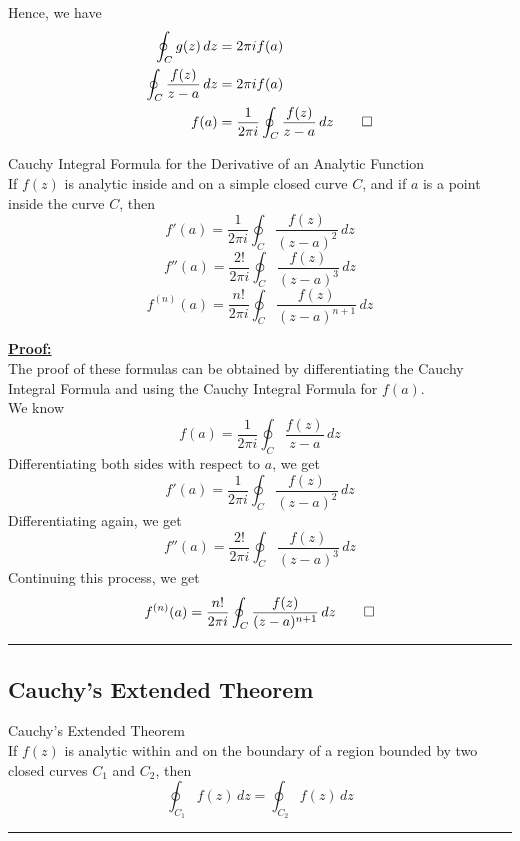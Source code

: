Hence, we have
\begin{align*}
    \oint_C g(z) \, dz &= 2\pi i f(a) \\
    \oint_C \frac{f(z)}{z-a} \, dz &= 2\pi i f(a) \\
    f(a) &= \frac{1}{2\pi i} \oint_C \frac{f(z)}{z-a} \, dz \qed
\end{align*}

\begin{theorem}{Cauchy Integral Formula for the Derivative of an Analytic Function}{}
    \\If $f(z)$ is analytic inside and on a simple closed curve $C$, and if $a$ is a point inside the curve $C$, then
    \begin{equation}
        f'(a) = \frac{1}{2\pi i} \oint_C \frac{f(z)}{(z-a)^2} \, dz
    \end{equation}
    \begin{equation}
        f''(a) = \frac{2!}{2\pi i} \oint_C \frac{f(z)}{(z-a)^3} \, dz
    \end{equation}
    \begin{equation}
        f^{(n)}(a) = \frac{n!}{2\pi i} \oint_C \frac{f(z)}{(z-a)^{n+1}} \, dz
    \end{equation}
\end{theorem}

\underline{\textbf{Proof:}} \\
The proof of these formulas can be obtained by differentiating the Cauchy Integral Formula and using the Cauchy Integral Formula for $f(a)$. \\
We know
\begin{equation}
    f(a) = \frac{1}{2\pi i} \oint_C \frac{f(z)}{z-a} \, dz
\end{equation} 
Differentiating both sides with respect to $a$, we get
\begin{equation}
    f'(a) = \frac{1}{2\pi i} \oint_C \frac{f(z)}{(z-a)^2} \, dz
\end{equation}
Differentiating again, we get
\begin{equation}
    f''(a) = \frac{2!}{2\pi i} \oint_C \frac{f(z)}{(z-a)^3} \, dz
\end{equation}
Continuing this process, we get
\begin{equation}
    f^{(n)}(a) = \frac{n!}{2\pi i} \oint_C \frac{f(z)}{(z-a)^{n+1}} \, dz \qed
\end{equation}

\vspace{20pt}\rule{3in}{1pt}


\subsection{Cauchy's Extended Theorem}
\begin{theorem}{Cauchy's Extended Theorem}{}
    \\If $f(z)$ is analytic within and on the boundary of a region bounded by two closed curves $C_1$ and $C_2$, then
    \begin{equation}
        \oint_{C_1} f(z) \, dz = \oint_{C_2} f(z) \, dz
    \end{equation}
\end{theorem}

\vspace{20pt}\rule{3in}{1pt}
